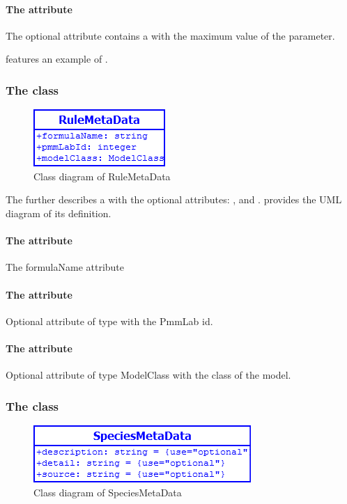 \paragraph{The  attribute}
The optional attribute  contains a  with the
maximum value of the parameter.

 features an example of \ParameterMetaData.


\subsubsection{The  class}
\begin{figure}
	\includegraphics[scale=0.8]{img/RuleMetaData}
	\caption{Class diagram of RuleMetaData}
	\label{RuleMetaData}
\end{figure}

\label{rulemetadata-class}
The \RuleMetaData further describes a \Rule with the optional attributes:
,  and . 
provides the UML diagram of its definition.

\paragraph{The  attribute}
The formulaName attribute

\paragraph{The  attribute}
Optional attribute of type  with the PmmLab id.

\paragraph{The  attribute}
Optional attribute of type ModelClass with the class of the model.


\subsubsection{The  class}
\begin{figure}
	\includegraphics[scale=0.8]{img/SpeciesMetaData}
	\caption{Class diagram of SpeciesMetaData}
	\label{SpeciesMetaData}
\end{figure}

